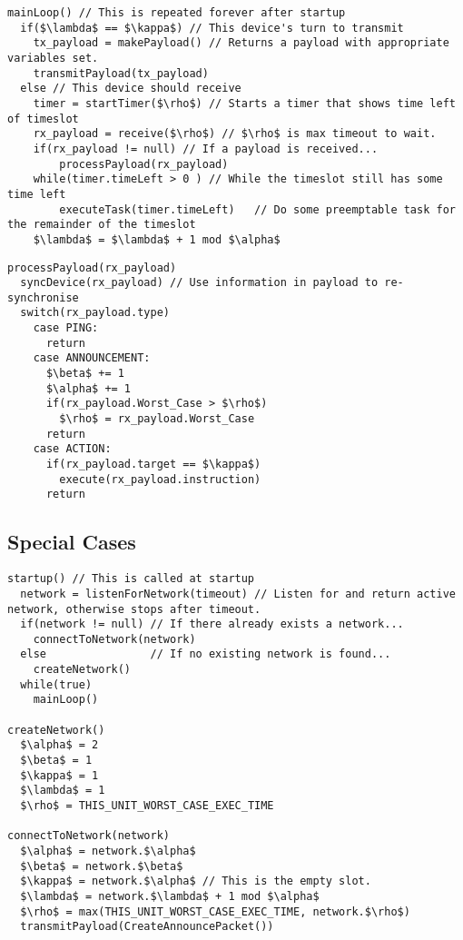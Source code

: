 \begin{lstlisting}[style=customc,mathescape=true,caption={Pseudocode example of the main loop}]  
mainLoop() // This is repeated forever after startup
  if($\lambda$ == $\kappa$) // This device's turn to transmit
  	tx_payload = makePayload() // Returns a payload with appropriate variables set.
  	transmitPayload(tx_payload)
  else // This device should receive
  	timer = startTimer($\rho$) // Starts a timer that shows time left of timeslot
  	rx_payload = receive($\rho$) // $\rho$ is max timeout to wait. 
  	if(rx_payload != null) // If a payload is received...
  	    processPayload(rx_payload)
  	while(timer.timeLeft > 0 ) // While the timeslot still has some time left
  	    executeTask(timer.timeLeft)   // Do some preemptable task for the remainder of the timeslot
  	$\lambda$ = $\lambda$ + 1 mod $\alpha$   
\end{lstlisting}  

\begin{lstlisting}[style=customc,mathescape=true,caption={Pseudocode example of the method that processes the payload}]  
processPayload(rx_payload)
  syncDevice(rx_payload) // Use information in payload to re-synchronise
  switch(rx_payload.type)
    case PING:
      return
    case ANNOUNCEMENT:
      $\beta$ += 1
      $\alpha$ += 1
      if(rx_payload.Worst_Case > $\rho$)
        $\rho$ = rx_payload.Worst_Case
      return
    case ACTION:
      if(rx_payload.target == $\kappa$)
        execute(rx_payload.instruction)
      return         
\end{lstlisting}

\subsection{Special Cases} %
\label{sub:special_cases} 


\begin{lstlisting}[style=customc,mathescape=true,caption={Pseudocode example of special case functions}]
startup() // This is called at startup                                           
  network = listenForNetwork(timeout) // Listen for and return active network, otherwise stops after timeout.
  if(network != null) // If there already exists a network...
    connectToNetwork(network)
  else                // If no existing network is found...
    createNetwork()
  while(true)
    mainLoop()
  
createNetwork()
  $\alpha$ = 2
  $\beta$ = 1
  $\kappa$ = 1
  $\lambda$ = 1
  $\rho$ = THIS_UNIT_WORST_CASE_EXEC_TIME
  
connectToNetwork(network)
  $\alpha$ = network.$\alpha$
  $\beta$ = network.$\beta$
  $\kappa$ = network.$\alpha$ // This is the empty slot.
  $\lambda$ = network.$\lambda$ + 1 mod $\alpha$
  $\rho$ = max(THIS_UNIT_WORST_CASE_EXEC_TIME, network.$\rho$)
  transmitPayload(CreateAnnouncePacket())
\end{lstlisting}   
